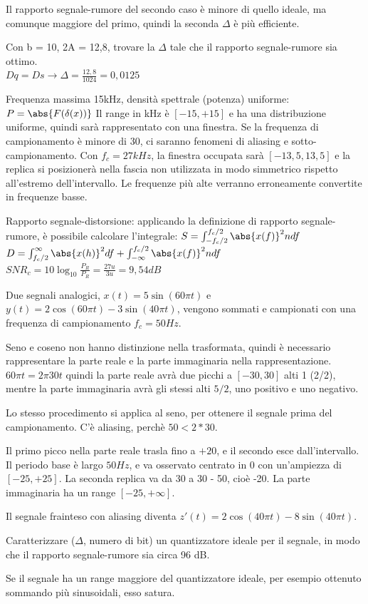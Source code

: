 Il rapporto segnale-rumore del secondo caso è minore di quello ideale, ma comunque maggiore del primo, quindi la seconda $\Delta$ è più efficiente.

Con b = 10, 2A = 12,8, trovare la $\Delta$ tale che il rapporto segnale-rumore sia ottimo.\\
$Dq = Ds \rightarrow \Delta = \frac{12,8}{1024} = 0,0125$

Frequenza massima 15kHz, densità spettrale (potenza) uniforme: $P = \abs{F(\delta(x))}$
Il range in kHz è $[-15, +15]$ e ha una distribuzione uniforme, quindi sarà rappresentato con una finestra. 
Se la frequenza di campionamento è minore di 30, ci saranno fenomeni di aliasing e sotto-campionamento. 
Con $f_c = 27 kHz$, la finestra occupata sarà $[-13,5, 13,5]$ e la replica si posizionerà nella fascia non utilizzata in modo simmetrico rispetto all'estremo dell'intervallo. Le frequenze più alte verranno erroneamente convertite in frequenze basse.

Rapporto segnale-distorsione: applicando la definizione di rapporto segnale-rumore, è possibile calcolare l'integrale: $S = \int_{-f_c/2}^{f_c/2}\abs{x(f)}^2ndf$
$D = \int_{f_c/2}^{\infty} \abs{x(h)}^2 df +  \int_{-\infty}^{f_c/2}\abs{x(f)}^2ndf$
$SNR_c = 10\log_{10} \frac{P_R}{P_R} = \frac{27u}{3u} = 9,54 dB$

Due segnali analogici, $x(t) = 5\sin(60\pi t)$ e $y(t) = 2\cos(60\pi t) - 3\sin(40\pi t)$, vengono sommati e campionati con una frequenza di campionamento $f_c = 50 Hz$. 

Seno e coseno non hanno distinzione nella trasformata, quindi è necessario rappresentare la parte reale e la parte immaginaria nella rappresentazione. 
$60\pi t = 2\pi 30t$ quindi la parte reale avrà due picchi a $[-30, 30]$ alti 1 (2/2), mentre la parte immaginaria avrà gli stessi alti $5 / 2$, uno positivo e uno negativo.

Lo stesso procedimento si applica al seno, per ottenere il segnale prima del campionamento. C'è aliasing, perchè $50 < 2 * 30$. 

Il primo picco nella parte reale trasla fino a $+20$, e il secondo esce dall'intervallo. Il periodo base è largo $50 Hz$, e va osservato centrato in 0 con un'ampiezza di $[-25, +25]$. La seconda replica va da 30 a 30 - 50, cioè -20. La parte immaginaria ha un range $[-25, +\infty]$.

Il segnale frainteso con aliasing diventa $z'(t) = 2\cos(40\pi t) - 8\sin(40\pi t)$.

Caratterizzare ($\Delta$, numero di bit) un quantizzatore ideale per il segnale, in modo che il rapporto segnale-rumore sia circa 96 dB.

Se il segnale ha un range maggiore del quantizzatore ideale, per esempio ottenuto sommando più sinusoidali, esso satura.
